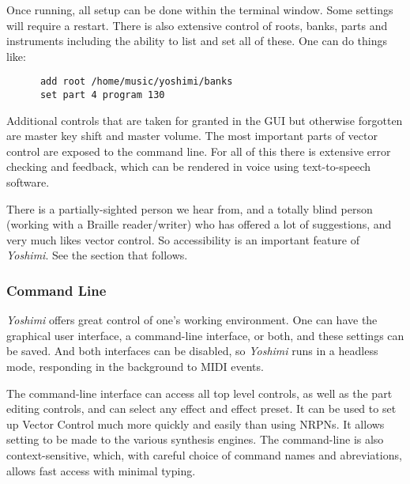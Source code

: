\documentclass[
 11pt,
 twoside,
 a4paper,
 final                                 %
]{article}
\begin{document}

   Once running, all setup can be done within the terminal window.
   Some settings will require a restart.
   There is also extensive control of
   roots, banks, parts and instruments including the ability to list and set
   all of these. One can do things like:

   \begin{verbatim}
      add root /home/music/yoshimi/banks
      set part 4 program 130
   \end{verbatim}

   Additional controls that are taken for granted in the GUI but
   otherwise forgotten are master key shift and master volume.  The
   most important parts of vector control are exposed to the command line.
   For all of this there is extensive error checking and feedback, which can be
   rendered in voice using text-to-speech software.

   There is a partially-sighted person we hear from, and
   a totally blind person (working with a Braille reader/writer) who has
   offered a lot of suggestions, and very much likes vector control.  So
   accessibility  is an important feature of
   \textsl{Yoshimi}.  See the section that follows.

\subsubsection{Command Line}
\label{subsubsec:new_features_command_line}

   \textsl{Yoshimi} offers great control of one's working environment.
   One can have the graphical user interface, a command-line
   interface, or both, and these settings can be saved.  And both
   interfaces can be disabled, so \textsl{Yoshimi} runs in a headless
   mode, responding in the background to MIDI events.

   The command-line interface can access all top level controls, as well as the
   part editing controls, and can select any effect and effect preset.  It can be
   used to set up Vector Control much more quickly and easily than using NRPNs.
   It allows setting to be made to the various synthesis engines.
   The command-line is also context-sensitive, which, with careful choice
   of command names and abreviations, allows fast access with minimal
   typing.
\end{document}
